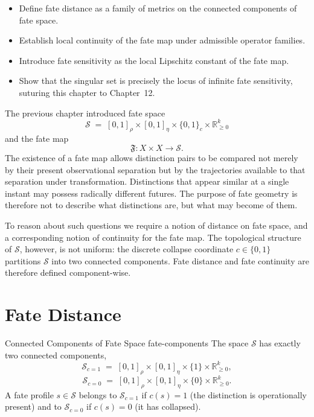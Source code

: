 \documentclass[12pt,twoside,openright]{book}
\newcommand{\distPairs}{X\times X}
\newcommand{\fateMap}{\mathfrak{F}}
\newcommand{\fateSpace}{\mathcal{S}}
\newcommand{\survRatio}{\rho}             %
\newcommand{\repEff}{\eta}               %
\newcommand{\collapseInd}{c}             %
\newcommand{\fateComp}[1]{\fateSpace_{\collapseInd=#1}}
\newenvironment{objectives}{%
  \begin{tcolorbox}[colback=DistBlue!5,colframe=DistBlue,
    title={\faCheckCircle\enspace Chapter Objectives},
    fonttitle=\sffamily\bfseries\color{white},
    attach boxed title to top left={yshift=-2mm,xshift=4mm},
    boxed title style={colback=DistBlue},breakable]
  \begin{itemize}[leftmargin=*,nosep]}{%
  \end{itemize}\end{tcolorbox}\vspace{1em}}
\providecommand{\fateComp}[1]{\fateSpace_{\collapseInd=#1}}
\begin{document}
\begin{objectives}
\item Define fate distance as a family of metrics on the connected
  components of fate space.
\item Establish local continuity of the fate map under admissible
  operator families.
\item Introduce fate sensitivity as the local Lipschitz constant of
  the fate map.
\item Show that the singular set is precisely the locus of infinite
  fate sensitivity, suturing this chapter to Chapter~12.
\end{objectives}

The previous chapter introduced fate space
\[
  \fateSpace
  \;=\;
  [0,1]_{\survRatio}
  \times
  [0,1]_{\repEff}
  \times
  \{0,1\}_{\collapseInd}
  \times
  \mathbb{R}_{\ge0}^{k}
\]
and the fate map
\[
  \fateMap:\distPairs\longrightarrow\fateSpace.
\]
The existence of a fate map allows distinction pairs to be
compared not merely by their present observational separation
but by the trajectories available to that separation under
transformation. Distinctions that appear similar at a single
instant may possess radically different futures. The purpose
of fate geometry is therefore not to describe what distinctions
are, but what may become of them.

To reason about such questions we require a notion of distance
on fate space, and a corresponding notion of continuity for the
fate map. The topological structure of $\fateSpace$, however,
is not uniform: the discrete collapse coordinate
$\collapseInd\in\{0,1\}$ partitions $\fateSpace$ into two
connected components. Fate distance and fate continuity are
therefore defined component-wise.

\section{Fate Distance}

\begin{definition}{Connected Components of Fate Space}%
  {fate-components}
The space $\fateSpace$ has exactly two connected components,
\[
  \fateComp{1}
  \;=\;
  [0,1]_{\survRatio}\times[0,1]_{\repEff}
    \times\{1\}\times\mathbb{R}_{\ge0}^{k},
\]
\[
  \fateComp{0}
  \;=\;
  [0,1]_{\survRatio}\times[0,1]_{\repEff}
    \times\{0\}\times\mathbb{R}_{\ge0}^{k}.
\]
A fate profile $s\in\fateSpace$ belongs to $\fateComp{1}$ if
$\collapseInd(s)=1$ (the distinction is operationally present)
and to $\fateComp{0}$ if $\collapseInd(s)=0$ (it has collapsed).
\end{definition}
\end{document}
